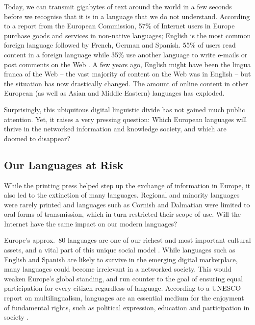 \begin{multicols}{2}
  Today, we can transmit gigabytes of text around the world in a few seconds before we recognise that it is in a language that we do not understand. According to a report from the European Commission, 57\% of Internet users in Europe purchase goods and services in non-native languages; English is the most common foreign language followed by French, German and Spanish. 55\% of users read content in a foreign language while 35\% use another language to write e-mails or post comments on the Web \cite{EC1}. A few years ago, English might have been the lingua franca of the Web -- the vast majority of content on the Web was in English -- but the situation has now drastically changed. The amount of online content in other European (as well as Asian and Middle Eastern) languages has exploded.

  Surprisingly, this ubiquitous digital linguistic divide has not gained much public attention. Yet, it raises a very pressing question: Which European languages will thrive in the networked information and knowledge society, and which are doomed to disappear?

  \subsection{Our Languages at Risk}

  While the printing press helped step up the exchange of information in Europe, it also led to the extinction of many languages. Regional and minority languages were rarely printed and languages such as Cornish and Dalmatian were limited to oral forms of transmission, which in turn restricted their scope of use. Will the Internet have the same impact on our modern languages?


  Europe’s approx.~80 languages are one of our richest and most important cultural assets, and a vital part of this unique social model \cite{EC2}. While languages such as English and Spanish are likely to survive in the emerging digital marketplace, many languages could become irrelevant in a networked society. This would weaken Europe’s global standing, and run counter to the goal of ensuring equal participation for every citizen regardless of language. According to a UNESCO report on multilingualism, languages are an essential medium for the enjoyment of fundamental rights, such as political expression, education and participation in society \cite{Unesco1}.


\end{multicols}

